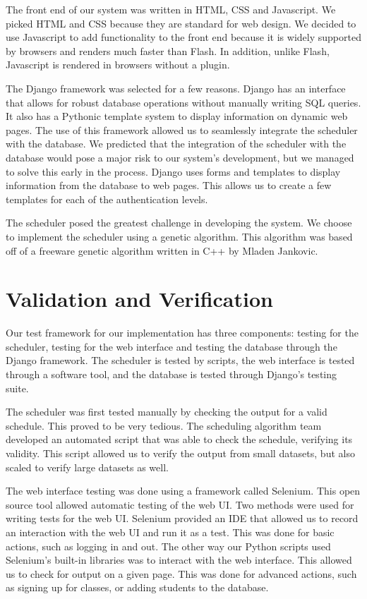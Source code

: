 \documentclass[12pt]{article}
\begin{document}
\begin{enumerate}
\begin{enumerate}
The front end of our system was written in HTML, CSS and Javascript. We picked HTML and CSS because they are standard for web design. We decided to use Javascript to add functionality to the front end because it is widely supported by browsers and renders much faster than Flash. In addition, unlike Flash, Javascript is rendered in browsers without a plugin.

The Django framework was selected for a few reasons. Django has an interface that allows for robust database operations without manually writing SQL queries. It also has a Pythonic template system to display information on dynamic web pages. The use of this framework allowed us to seamlessly integrate the scheduler with the database. We predicted that the integration of the scheduler with the database would pose a major risk to our system's development, but we managed to solve this early in the process. Django uses forms and templates to display information from the database to web pages. This allows us to create a few templates for each of the authentication levels. %

The scheduler posed the greatest challenge in developing the system. We choose to implement the scheduler using a genetic algorithm. This algorithm was based off of a freeware genetic algorithm written in C++ by Mladen Jankovic. 

\section{Validation and Verification} %
Our test framework for our implementation has three components: testing for the scheduler, testing for the web interface and testing the database through the Django framework. The scheduler is tested by scripts, the web interface is tested through a software tool, and the database is tested through Django's testing suite.

The scheduler was first tested manually by checking the output for a valid schedule. This proved to be very tedious. The scheduling algorithm team developed an automated script that was able to check the schedule, verifying its validity. This script allowed us to verify the output from small datasets, but also scaled to verify large datasets as well.

The web interface testing was done using a framework called Selenium. This open source tool allowed automatic testing of the web UI. Two methods were used for writing tests for the web UI. Selenium provided an IDE that allowed us to record an interaction with the web UI and run it as a test. This was done for basic actions, such as logging in and out. The other way our Python scripts used Selenium's built-in libraries was to interact with the web interface. This allowed us to check for output on a given page. This was done for advanced actions, such as signing up for classes, or adding students to the database.


\end{enumerate}
\end{enumerate}
\end{document}

